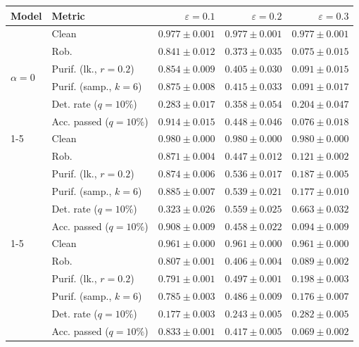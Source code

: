 \begin{table}[htbp]
\centering
\small
\begin{tabular}{@{}llrrr@{}}
\toprule
Model & Metric & $\varepsilon=0.1$ & $\varepsilon=0.2$ & $\varepsilon=0.3$ \\
\midrule
\multirow{6}{*}{$\alpha{=}0$} & Clean & $0.977 \pm 0.001$ & $0.977 \pm 0.001$ & $0.977 \pm 0.001$ \\
 & Rob. & $0.841 \pm 0.012$ & $0.373 \pm 0.035$ & $0.075 \pm 0.015$ \\
 & Purif. (lk., $r=0.2$) & $0.854 \pm 0.009$ & $0.405 \pm 0.030$ & $0.091 \pm 0.015$ \\
 & Purif. (samp., $k=6$) & $0.875 \pm 0.008$ & $0.415 \pm 0.033$ & $0.091 \pm 0.017$ \\
 & Det. rate ($q=10\%$) & $0.283 \pm 0.017$ & $0.358 \pm 0.054$ & $0.204 \pm 0.047$ \\
 & Acc. passed ($q=10\%$) & $\mathbf{0.914 \pm 0.015}$ & $0.448 \pm 0.046$ & $0.076 \pm 0.018$ \\
\cmidrule(lr){1-5}
\multirow{6}{*}{$\alpha{=}0.01$} & Clean & $\mathbf{0.980 \pm 0.000}$ & $\mathbf{0.980 \pm 0.000}$ & $\mathbf{0.980 \pm 0.000}$ \\
 & Rob. & $\mathbf{0.871 \pm 0.004}$ & $0.447 \pm 0.012$ & $0.121 \pm 0.002$ \\
 & Purif. (lk., $r=0.2$) & $\mathbf{0.874 \pm 0.006}$ & $0.536 \pm 0.017$ & $0.187 \pm 0.005$ \\
 & Purif. (samp., $k=6$) & $\mathbf{0.885 \pm 0.007}$ & $0.539 \pm 0.021$ & $0.177 \pm 0.010$ \\
 & Det. rate ($q=10\%$) & $\mathbf{0.323 \pm 0.026}$ & $0.559 \pm 0.025$ & $0.663 \pm 0.032$ \\
 & Acc. passed ($q=10\%$) & $0.908 \pm 0.009$ & $0.458 \pm 0.022$ & $0.094 \pm 0.009$ \\
\cmidrule(lr){1-5}
\multirow{6}{*}{$\alpha{=}0.1$} & Clean & $0.961 \pm 0.000$ & $0.961 \pm 0.000$ & $0.961 \pm 0.000$ \\
 & Rob. & $0.807 \pm 0.001$ & $0.406 \pm 0.004$ & $0.089 \pm 0.002$ \\
 & Purif. (lk., $r=0.2$) & $0.791 \pm 0.001$ & $0.497 \pm 0.001$ & $0.198 \pm 0.003$ \\
 & Purif. (samp., $k=6$) & $0.785 \pm 0.003$ & $0.486 \pm 0.009$ & $0.176 \pm 0.007$ \\
 & Det. rate ($q=10\%$) & $0.177 \pm 0.003$ & $0.243 \pm 0.005$ & $0.282 \pm 0.005$ \\
 & Acc. passed ($q=10\%$) & $0.833 \pm 0.001$ & $0.417 \pm 0.005$ & $0.069 \pm 0.002$ \\

\end{tabular}
\end{table}
